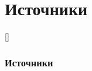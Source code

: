 \section{Источники}
[\bibname]{}


\begin{frame}[allowframebreaks]
	\frametitle{Источники}
	\printbibliography
\end{frame}